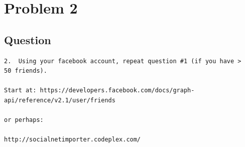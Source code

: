 \section{Problem 2}
\label{part2}
\subsection*{Question}
\begingroup
\begin{verbatim}
2.  Using your facebook account, repeat question #1 (if you have >
50 friends).

Start at: https://developers.facebook.com/docs/graph-api/reference/v2.1/user/friends

or perhaps:

http://socialnetimporter.codeplex.com/

\end{verbatim}
\newpage

